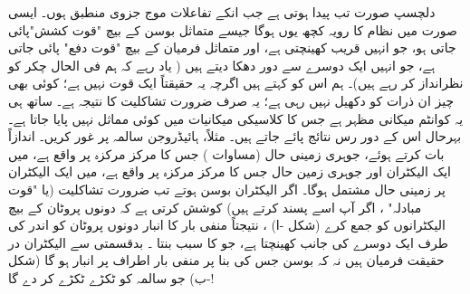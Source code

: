 دلچسپ صورت تب پیدا ہوتی ہے جب انکے  تفاعلات موج   جزوی منطبق ہوں۔ ایسی صورت میں نظام کا رویہ کچھ یوں ہوگا جیسے متماثل بوسن کے بیچ  "قوت کشش"پائی جاتی ہو،  جو انہیں قریب کھینچتی ہے،  اور  متماثل فرمیان کے بیچ "قوت دفع" پائی  جاتی ہے،  جو انہیں ایک دوسرے سے دور دھکا  دیتے ہیں ( یاد رہے کہ ہم فی الحال چکر کو نظرانداز کر رہے ہیں)۔ ہم اس کو   کہتے ہیں اگرچہ یہ حقیقتاً ایک قوت نہیں ہے؛ کوئی بھی چیز ان ذرات کو دکھیل نہیں رہی ہے؛  یہ صرف ضرورت تشاکلیت کا   نتیجہ ہے۔  ساتھ ہی یہ کوانٹم میکانی مظہر ہے جس کا کلاسیکی میکانیات میں کوئی مماثل نہیں پایا جاتا ہے۔ بہرحال اس کے دور رس  نتائج پائے جاتے ہیں۔ مثلاً،  ہائیڈروجن سالمہ  پر غور کریں۔ اندازاً بات کرتے ہوئے،  جوہری زمینی حال   (مساوات )   جس کا مرکز مرکزہ  پر واقع ہے، میں ایک الیکٹران اور  جوہری زمین حال جس کا مرکز مرکزہ  پر واقع ہے،   میں ایک الیکٹران  پر زمینی حال مشتمل ہوگا۔ اگر الیکٹران بوسن ہوتے تب ضرورت تشاکلیت  (یا  "قوت مبادلہ" ، اگر آپ اسے پسند کرتے ہیں) کوشش کرتی ہے کہ دونوں پروٹان کے بیچ الیکٹرانوں کو جمع کرے
 (شکل -ا)  ، نتیجتاً منفی بار کا انبار دونوں پروٹان کو اندر کی طرف ایک دوسرے کی جانب کھینچتا ہے،  جو  کا سبب بنتا ۔  بدقسمتی سے  الیکٹران  در حقیقت  فرمیان ہیں نہ کہ بوسن جس کی بنا    پر منفی بار   اطراف پر انبار  ہو گا   (شکل -ب)   جو سالمہ کو  ٹکڑے ٹکڑے کر دے  گا!


